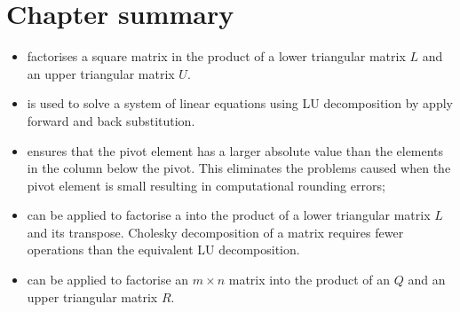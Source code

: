 \documentclass[letterpaper,10pt,english]{jupyterBook}
\begin{document}
\section{Chapter summary}
\label{\detokenize{6_Direct_methods/6.5_Direct_methods_summary:chapter-summary}}\label{\detokenize{6_Direct_methods/6.5_Direct_methods_summary::doc}}\begin{itemize}
\item {} 
\sphinxAtStartPar
{\hyperref[\detokenize{6_Direct_methods/6.1_LU_decomposition:lu-definition}]{}} factorises a square matrix in the product of a lower triangular matrix \(L\) and an upper triangular matrix \(U\).

\item {} 
\sphinxAtStartPar
{\hyperref[\detokenize{6_Direct_methods/6.1_LU_decomposition:crouts-method-section}]{}} is used to solve a system of linear equations using LU decomposition by apply forward and back substitution.

\item {} 
\sphinxAtStartPar
{\hyperref[\detokenize{6_Direct_methods/6.2_LUP_decomposition:partial-pivoting-section}]{}} ensures that the pivot element has a larger absolute value than the elements in the column below the pivot. This eliminates the problems caused when the pivot element is small resulting in computational rounding errors;

\item {} 
\sphinxAtStartPar
{\hyperref[\detokenize{6_Direct_methods/6.3_Cholesky_decomposition:cholesky-definition}]{}} can be applied to factorise a {\hyperref[\detokenize{6_Direct_methods/6.3_Cholesky_decomposition:positive-definite-example}]{}} into the product of a lower triangular matrix \(L\) and its transpose. Cholesky decomposition of a matrix requires fewer operations than the equivalent LU decomposition.

\item {} 
\sphinxAtStartPar
{\hyperref[\detokenize{6_Direct_methods/6.4_QR_decomposition:qr-section}]{}} can be applied to factorise an \(m\times n\) matrix into the product of an {\hyperref[\detokenize{6_Direct_methods/6.4_QR_decomposition:orthogonal-matrix-definition}]{}} \(Q\) and an upper triangular matrix \(R\).


\end{itemize}
\end{document}
